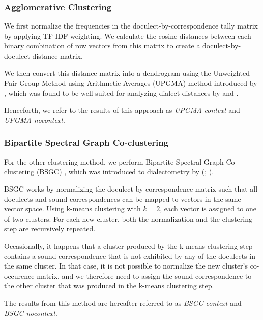\documentclass[a4paper, 11pt]{article}
\begin{document}
\subsubsection{Agglomerative Clustering}

We first normalize the frequencies
in the doculect-by-correspondence tally matrix
by applying TF-IDF weighting.
We calculate the cosine distances between each
binary combination of row vectors from this matrix
to create a doculect-by-doculect distance matrix.

We then convert this distance matrix into a dendrogram using the
Unweighted Pair Group Method using Arithmetic Averages
(UPGMA) method introduced by \citet{sokal1958statistical},
which was found to be well-suited
for analyzing dialect distances by \citet[p. 153]{heeringa2004measuring}
and \citet{prokic2008recognizing}.

Henceforth, we refer to the results of this approach
as \textit{UPGMA-context} and \textit{UPGMA-nocontext}.

\subsubsection{Bipartite Spectral Graph Co-clustering}

For the other clustering method, we perform Bipartite Spectral Graph Co-clustering (BSGC)
\citep{dhillon2001co-clustering},
which was introduced to 
dialectometry
by \citeauthor*{wieling2009bipartite} (\citeyear{wieling2009bipartite}; \citeyear{wieling2010hierarchical}).

BSGC works by normalizing the doculect-by-correspondence matrix such that all doculects and sound correspondences can be mapped to vectors in the same vector space.
Using k-means clustering with $k=2$, each vector is assigned to one of two clusters. 
For each new cluster, both the normalization and the clustering step are recursively repeated.

Occasionally, it happens that a cluster produced by the k-means clustering step contains a sound correspondence that is not exhibited
by any of the doculects in the same cluster.
In that case, it is not possible to normalize the new cluster's co-occurence matrix, and we therefore need to assign the sound correspondence to the other cluster that was produced in the k-means clustering step.

The results from this method are hereafter referred to
as \textit{BSGC-context} and \textit{BSGC-nocontext}.
\end{document}
